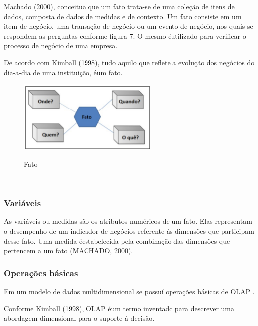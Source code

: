 Machado (2000), conceitua que um fato trata-se de uma coleção de itens de dados, composta de dados de medidas e de contexto. Um fato consiste em um item de negócio, uma transação de negócio ou um evento de negócio, nos quais se respondem as perguntas conforme figura 7. O mesmo \'{e}utilizado para verificar o processo de negócio de uma empresa.

De acordo com Kimball (1998), tudo aquilo que reflete a evolução dos negócios do dia-a-dia de uma instituição, \'{e}um fato.

\begin{figure}[H]
	\vspace*{0,2cm}
    \centering
    \caption{Fato}
    \includegraphics[width=0.6\textwidth]{./04-figuras/figura-07}
    \label{fig:ilustfig07}
\end{figure}
\vspace*{-0,9cm}
{\raggedright {}} \\

\subsubsection{Vari\'{a}veis}

As variáveis ou medidas são os atributos numéricos de um fato. Elas representam o desempenho de um indicador de negócios referente às dimensões que participam desse fato. Uma medida \'{e}estabelecida pela combinação das dimensões que pertencem a um fato (MACHADO, 2000).

\subsubsection{Opera\c{c}ões b\'{a}sicas}

Em um modelo de dados multidimensional se possuí operações básicas de 
OLAP .

Conforme Kimball (1998), OLAP \'{e}um termo inventado para descrever uma abordagem dimensional para o suporte à decisão.

